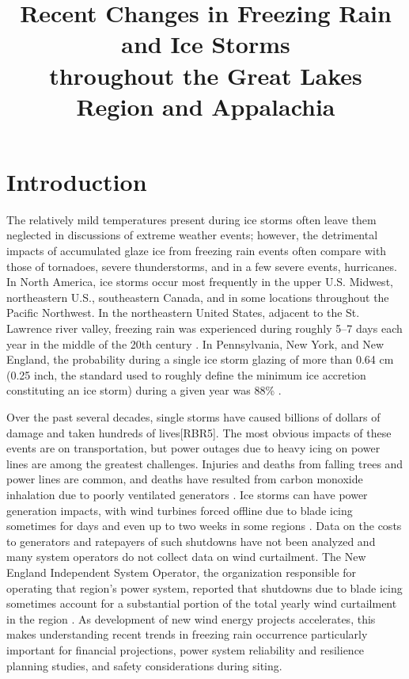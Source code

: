 \documentclass[twocol]{ametsoc}
\title{Recent Changes in Freezing Rain and Ice Storms\\ throughout the Great Lakes Region and Appalachia}
\affiliation{Department of Climate and Space Sciences and Engineering, University of Michigan, Ann Arbor, Michigan}
\begin{document}
\maketitle


%
\section{Introduction}
The relatively mild temperatures present during ice storms often leave them neglected in discussions of extreme weather events; however, the detrimental impacts of accumulated glaze ice from freezing rain events often compare with those of tornadoes, severe thunderstorms, and in a few severe events, hurricanes.  In North America, ice storms occur most frequently in the upper U.S. Midwest, northeastern U.S., southeastern Canada, and in some locations throughout the Pacific Northwest. In the northeastern United States, adjacent to the St. Lawrence river valley, freezing rain was experienced during roughly 5--7 days each year in the middle of the 20th century \citep{changnon2003temporal}. In Pennsylvania, New York, and New England, the probability during a single ice storm glazing of more than 0.64 cm (0.25 inch, the standard used to roughly define the minimum ice accretion constituting an ice storm) during a given year was 88\% \citep{nwsglossary,tattelman1973estimated}. 

Over the past several decades, single storms have caused billions of dollars of damage and taken hundreds of lives[RBR5]. The most obvious impacts of these events are on transportation, but power outages due to heavy icing on power lines are among the greatest challenges. Injuries and deaths from falling trees and power lines are common, and deaths have resulted from carbon monoxide inhalation due to poorly ventilated generators \citep{daley2000outbreak}.  Ice storms can have power generation impacts, with wind turbines forced offline due to blade icing sometimes for days and even up to two weeks in some regions \citep{davis2014forecast}. Data on the costs to generators and ratepayers of such shutdowns have not been analyzed and many system operators do not collect data on wind curtailment. The New England Independent System Operator, the organization responsible for operating that region's power system, reported that shutdowns due to blade icing sometimes account for a substantial portion of the total yearly wind curtailment in the region \citep{bird2014wind}. As development of new wind energy projects accelerates, this makes understanding recent trends in freezing rain occurrence particularly important for financial projections, power system reliability and resilience planning studies, and safety considerations during siting. 
\end{document}
